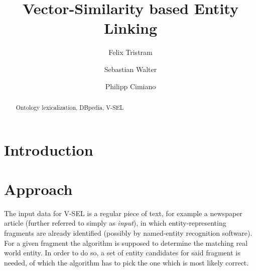 \documentclass[runningheads,a4paper]{llncs}
\newcommand{\keywords}[1]{\par\addvspace\baselineskip
\noindent\keywordname\enspace\ignorespaces#1}
\begin{document}
\mainmatter  %

\newcommand{\acronym}{V-SEL}



\title{Vector-Similarity based Entity Linking}

\author{Felix Tristram \and Sebastian Walter \and Philipp Cimiano}



\maketitle


\begin{abstract}


\keywords{Ontology lexicalization, DBpedia, \acronym{}}
\end{abstract}

\section{Introduction}\label{sec:introduction}
\lipsum[1-4]

\section{Approach}\label{sec:approach}
The input data for {\acronym} is a regular piece of text, for example a newspaper article (further referred to simply as \textit{input}), in which entity-representing fragments are already identified (possibly by named-entity recognition software). For a given fragment the algorithm is supposed to determine the matching real world entity. In order to do so, a set of entity candidates for said fragment is needed, of which the algorithm has to pick the one which is most likely correct. 
\end{document}
